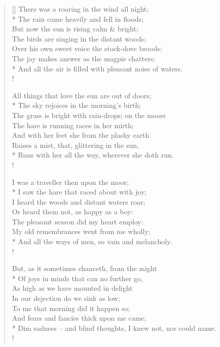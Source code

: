 \documentclass[MAIN]{subfiles}
\begin{document}
\settowidth{\versewidth}{There was a roaring in the wind all night;}
\begin{verse}[\versewidth]
There was a roaring in the wind all night;\\* 
\vin The rain came heavily and fell in floods;\\
But now the sun is rising calm \& bright;\\
\vin The birds are singing in the distant woods;\\ 
\vin Over his own sweet voice the stock-dove broods;\\ 
The jay makes answer as the magpie chatters;\\*
And all the air is filled with pleasant noise of waters.\\!

All things that love the sun are out of doors;\\*
\vin The sky rejoices in the morning's birth;\\
The grass is bright with rain-drops; on the moors\\ 
\vin The hare is running races in her mirth;\\
\vin And with her feet she from the plashy earth\\ 
Raises a mist, that, glittering in the sun,\\*
Runs with her all the way, wherever she doth run.\\! 

I was a traveller then upon the moor;\\*
\vin I saw the hare that raced about with joy;\\ 
I heard the woods and distant waters roar;\\
\vin Or heard them not, as happy as a boy:\\
\vin The pleasant season did my heart employ:\\ 
My old remembrances went from me wholly;\\*
And all the ways of men, so vain and melancholy.\\!

But, as it sometimes chanceth, from the might\\*
\vin Of joys in minds that can no further go,\\
As high as we have mounted in delight\\
\vin In our dejection do we sink as low;\\
\vin To me that morning did it happen so;\\
And fears and fancies thick upon me came;\\*
Dim sadness -- and blind thoughts, I knew not, nor could name.\\!


\end{verse}
\end{document}
